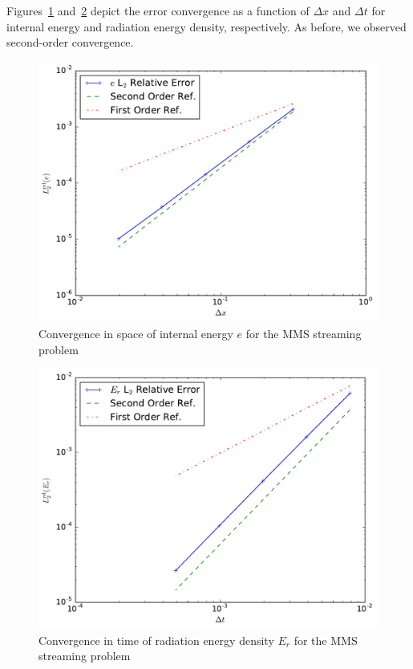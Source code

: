 \documentclass[preprint,12pt]{elsarticle}
\newcommand{\E}{{E_r}}
\begin{document}
Figures~\ref{fig:streaming_e} and~\ref{fig:streaming_mom} depict the error convergence as a function of $\Delta x$ and $\Delta t$ for
internal energy and radiation energy density, respectively.  As before, we observed
second-order convergence.

\begin{figure}[ht]
   \centering
   \includegraphics[width=\textwidth]{figures/MMS_streaming_e_convergence.pdf}
   \caption{\label{fig:streaming_e}Convergence in space of internal energy $e$ for the MMS streaming problem}
\end{figure}
\begin{figure}[ht]
   \centering
   \includegraphics[width=\textwidth]{figures/MMS_streaming_erad_convergence.pdf}
   \caption{\label{fig:streaming_mom}Convergence in time of radiation energy density $\E$ for the MMS streaming problem}
\end{figure}
\end{document}

